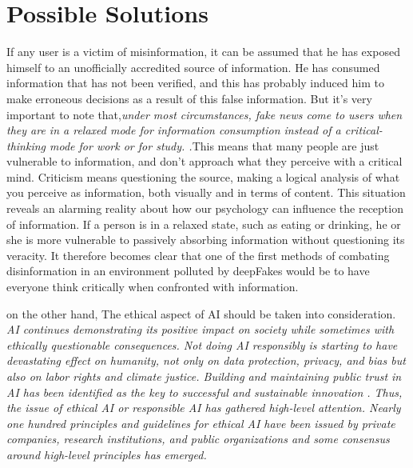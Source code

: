 \section{Possible Solutions}
If any user is a victim of misinformation, it can be assumed that he has exposed himself to an unofficially accredited source of information. He has consumed information that has not been verified, and this has probably induced him to make erroneous decisions as a result of this false information. But it's very important to note that,\emph{under most circumstances, fake news come to users when they are in a relaxed mode for information consumption instead of a critical-thinking mode for work or for study. \cite{kanohWhyPeopleBelieve2018}.}This means that many people are just vulnerable to information, and don't approach what they perceive with a critical mind. Criticism means questioning the source, making a logical analysis of what you perceive as information, both visually and in terms of content. This situation reveals an alarming reality about how our psychology can influence the reception of information. If a person is in a relaxed state, such as eating or drinking, he or she is more vulnerable to passively absorbing information without questioning its veracity. It therefore becomes clear that one of the first methods of combating disinformation in an environment polluted by deepFakes would be to have everyone think critically when confronted with information.

on the other hand, The ethical aspect of AI should be taken into consideration. \emph{  AI continues demonstrating its positive impact on society while sometimes with ethically questionable consequences. Not doing AI responsibly is starting to have devastating effect on humanity, not only on data protection, privacy, and bias but also on labor rights and climate justice. Building and maintaining public trust in AI has been identified as the key to successful and sustainable innovation . Thus, the issue of ethical AI or responsible AI has gathered high-level attention. Nearly one hundred principles and guidelines for ethical AI have been issued by private companies, research institutions, and public organizations  and some consensus around high-level principles has emerged.\cite{zhuAIEthicsOperationalizing2022}}